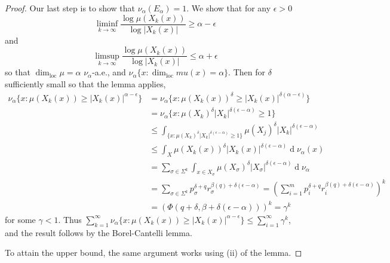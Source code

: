 \documentclass[11pt, a4paper]{memoir}
\theoremstyle{change}
\theoremstyle{plain}
\theoremstyle{nonumberplain}
\newtheorem{proof}{Proof}
\renewcommand{\d}[1]{\ensuremath{\operatorname{d}\!{#1}}}
\DeclareMathOperator{\loc}{loc}
\numberwithin{equation}{section}
\begin{document}
\begin{proof}
    Our last step is to show that $\nu_\alpha(E_\alpha)=1$.
    We show that for any $\epsilon>0$
    \begin{equation*}
        \liminf_{k\to\infty}\frac{\log\mu(X_k(x))}{\log|X_k(x)|}\geq\alpha-\epsilon
    \end{equation*}
    and
    \begin{equation*}
        \limsup_{k\to\infty}\frac{\log\mu(X_k(x))}{\log|X_k(x)|}\leq\alpha+\epsilon
    \end{equation*}
    so that $\dim_{\loc}\mu=\alpha$ $\nu_\alpha$-a.e., and $\nu_\alpha\{x:\dim_{\loc}mu(x)=\alpha\}$.
    Then for $\delta$ sufficiently small so that the lemma applies,
    \begin{align*}
        \nu_\alpha\{x:\mu(X_k(x))\geq|X_k(x)|^{\alpha-\epsilon}\} &= \nu_\alpha\{x:\mu(X_k(x))^\delta\geq|X_k(x)|^{\delta(\alpha-\epsilon)}\}\\
                                                                  &= \nu_\alpha\{x:\mu(X_k)^\delta|X_k|^{\delta(\epsilon-\alpha)}\geq 1\}\\
                                                                  &\leq \int_{\{x:\mu(X_k)^\delta|X_k|^{\delta(\epsilon-\alpha)}\geq 1\}}\mu(X_j)^\delta|X_k|^{\delta(\epsilon-\alpha)}\\
                                                                  &\leq \int_X\mu(X_k(x))^\delta|X_k(x)|^{\delta(\epsilon-\alpha)}\d{\nu_\alpha(x)}\\
                                                                  &= \sum_{\sigma\in\Sigma^k}\int_{x\in X_\sigma}\mu(X_\sigma)^\delta|X_\sigma|^{\delta(\epsilon-\alpha)}\d{\nu_\alpha}\\
                                                                  &=\sum_{\sigma\in\Sigma^k}p_\sigma^{\delta+q}r_\sigma^{\beta(q)+\delta(\epsilon-\alpha)}=\left(\sum_{i=1}^m p_i^{\delta+q}r_i^{\beta(q)+\delta(\epsilon-\alpha)}\right)^k\\
                                                                  &= \left(\Phi(q+\delta,\beta+\delta(\epsilon-\alpha))\right)^k=\gamma^k
    \end{align*}
    for some $\gamma<1$.
    Thus $\sum_{k=1}^\infty\nu_\alpha\{x:\mu(X_k(x))\geq|X_k(x)|^{\alpha-\epsilon}\}\leq\sum_{i=1}^\infty\gamma^k$, and the result follows by the Borel-Cantelli lemma.

    To attain the upper bound, the same argument works using (ii) of the lemma.
\end{proof}
\end{document}
